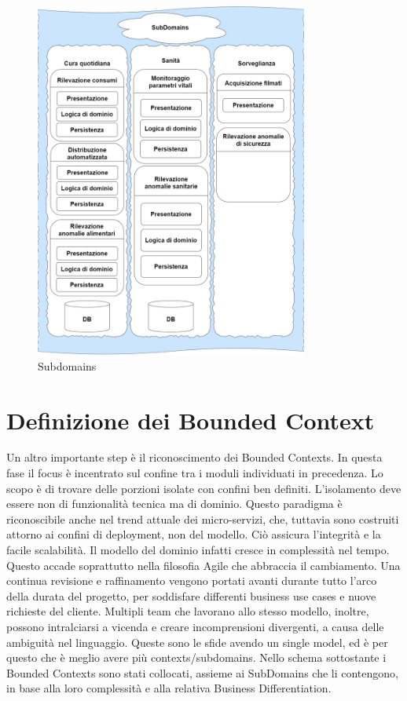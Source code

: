     \begin{figure}[H]
        \caption{Subdomains}
        \centering
        \includegraphics[width=0.8\textwidth]{DrawIo/subDomainsView.png}
    \end{figure}
    
    \section{Definizione dei Bounded Context}
    Un altro importante step è il riconoscimento dei Bounded Contexts. In questa fase il focus è incentrato sul confine tra i moduli individuati in precedenza. Lo scopo è di trovare delle porzioni isolate con confini ben definiti. L’isolamento deve essere non di funzionalità tecnica ma di dominio. Questo paradigma è riconoscibile anche nel trend attuale dei micro-servizi, che, tuttavia sono costruiti attorno ai confini di deployment, non del modello. Ciò assicura l’integrità e la facile scalabilità.
    Il modello del dominio infatti cresce in complessità nel tempo. Questo accade soprattutto nella filosofia Agile che abbraccia il cambiamento. Una continua revisione e raffinamento vengono portati avanti durante tutto l'arco della durata del progetto, per soddisfare differenti business use cases e nuove richieste del cliente. 
    Multipli team che lavorano allo stesso modello, inoltre, possono intralciarsi a vicenda e creare incomprensioni divergenti, a causa delle ambiguità nel linguaggio. 
    Queste sono le sfide avendo un single model, ed è per questo che è meglio avere più contexts/subdomains.
    Nello schema sottostante i Bounded Contexts sono stati collocati, assieme ai SubDomains che li contengono, in base alla loro complessità e alla relativa Business Differentiation. 
    
